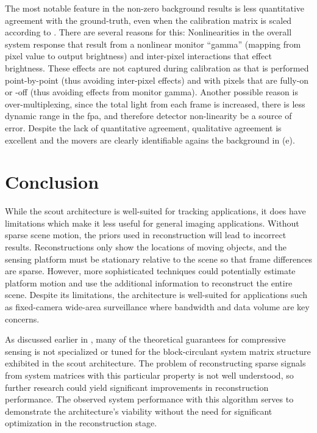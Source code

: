 The most notable feature in the non-zero background results is less quantitative agreement with the ground-truth, even when the calibration matrix is scaled according to . There are several reasons for this: Nonlinearities in the overall system response that result from a nonlinear monitor “gamma” (mapping from pixel value to output brightness) and inter-pixel interactions that effect brightness. These effects are not captured during calibration as that is performed point-by-point (thus avoiding inter-pixel effects) and with pixels that are fully-on or -off (thus avoiding effects from monitor gamma). Another possible reason is over-multiplexing, since the total light from each frame is increased, there is less dynamic range in the \gls{fpa}, and therefore detector non-linearity be a source of error. Despite the lack of quantitative agreement, qualitative agreement is excellent and the movers are clearly identifiable agains the background in (e).



\section{Conclusion}

While the \gls{scout} architecture is well-suited for tracking applications, it does have limitations which make it less useful for general imaging applications. Without sparse scene motion, the priors used in reconstruction will lead to incorrect results. Reconstructions only show the locations of moving objects, and the sensing platform must be stationary relative to the scene so that frame differences are sparse. However, more sophisticated techniques could potentially estimate platform motion and use the additional information to reconstruct the entire scene. Despite its limitations, the architecture is well-suited for applications such as fixed-camera wide-area surveillance where bandwidth and data volume are key concerns.

As discussed earlier in , many of the theoretical guarantees for \gls{compressive sensing} is not specialized or tuned for the block-circulant system matrix structure exhibited in the \gls{scout} architecture. The problem of reconstructing sparse signals from system matrices with this particular property is not well understood, so further research could yield significant improvements in reconstruction performance. The observed system performance with this algorithm serves to demonstrate the architecture’s viability without the need for significant optimization in the reconstruction stage.

